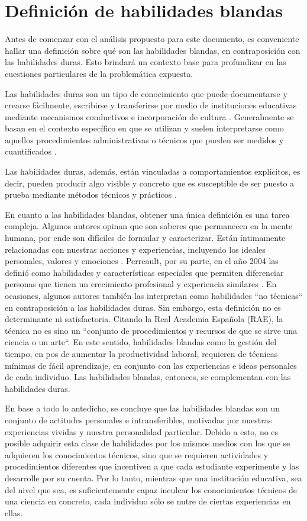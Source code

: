 \documentclass[conference]{IEEEtran}
\begin{document}
\section{Definición de habilidades blandas}
\label{scrivauto:3}

Antes de comenzar con el análisis propuesto para este documento, es conveniente hallar una definición sobre qué son las habilidades blandas, en contraposición con las habilidades duras. Esto brindará un contexto base para profundizar en las cuestiones particulares de la problemática expuesta.

Las habilidades duras son un tipo de conocimiento que puede documentarse y crearse fácilmente, escribirse y transferirse por medio de instituciones educativas mediante mecanismos conductivos e incorporación de cultura \cite{b5}. Generalmente se basan en el contexto específico en que se utilizan y suelen interpretarse como aquellos procedimientos administrativas  o técnicos que pueden ser medidos y cuantificados \cite{b4}. 

Las habilidades duras, además, están vinculadas a comportamientos explícitos, es decir, pueden producir algo visible y concreto que es susceptible de ser puesto a prueba mediante métodos técnicos y prácticos \cite{b5}.

En cuanto a las habilidades blandas, obtener una única definición es una tarea compleja. Algunos autores opinan que son saberes que permanecen en la mente humana, por ende son difíciles de formular y caracterizar. Están íntimamente relacionadas con nuestras acciones y experiencias, incluyendo los ideales personales, valores y emociones \cite{b5}.  Perreault, por su parte, en el año 2004 las definió como habilidades y características especiales que permiten diferenciar personas que tienen un crecimiento profesional y experiencia similares \cite{b4}. En ocasiones, algunos autores también las interpretan como habilidades ``no técnicas`` \cite{b3} en contraposición a las habilidades duras. Sin embargo, esta definición no es determinante ni satisfactoria. Citando la Real Academia Española (RAE), la técnica no es sino un ``conjunto de procedimientos y recursos de que se sirve una ciencia o un arte``. En este sentido, habilidades blandas como la gestión del tiempo, en pos de aumentar la productividad laboral, requieren de técnicas mínimas de fácil aprendizaje, en conjunto con las experiencias e ideas personales de cada individuo. Las habilidades blandas, entonces, se complementan con las habilidades duras.

En base a todo lo antedicho, se concluye que las habilidades blandas son un conjunto de actitudes personales e intransferibles, motivadas por nuestras experiencias vividas y nuestra personalidad particular. Debido a esto, no es posible adquirir esta clase de habilidades por los mismos medios con los que se adquieren los conocimientos técnicos, sino que se requieren actividades y procedimientos diferentes que incentiven a que cada estudiante experimente y las desarrolle por su cuenta. Por lo tanto, mientras que una institución educativa, sea del nivel que sea, es suficientemente capaz inculcar los conocimientos técnicos de una ciencia en concreto, cada individuo sólo se nutre de ciertas experiencias en ellas.
\end{document}
